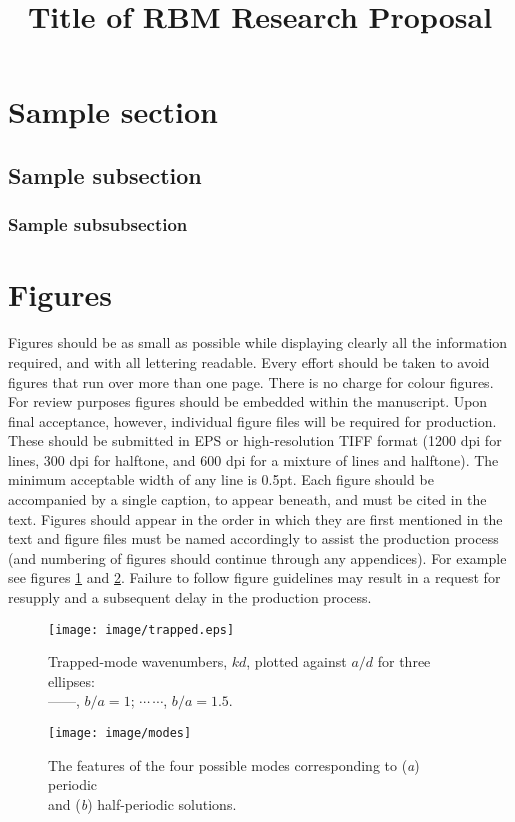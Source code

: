 \documentclass[12pt, a4paper]{article}
\title{Title of RBM Research Proposal}
\begin{document}


\section{Sample section}

\subsection{Sample subsection}

\subsubsection{Sample subsubsection}


\section{Figures}
Figures should be as small as possible while displaying clearly all the information required, and with all lettering readable. Every effort should be taken to avoid figures that run over more than one page. There is no charge for colour figures. For review purposes figures should be embedded within the manuscript. Upon final acceptance, however, individual figure files will be required for production. These should be submitted in EPS or high-resolution TIFF format (1200 dpi for lines, 300 dpi for halftone, and 600 dpi for a mixture of lines and halftone). The minimum acceptable width of any line is 0.5pt. Each figure should be accompanied by a single caption, to appear beneath, and must be cited in the text. Figures should appear in the order in which they are first mentioned in the text and figure files must be named accordingly to assist the production process (and numbering of figures should continue through any appendices). For example see figures \ref{fig:ka} and \ref{fig:kd}. Failure to follow figure guidelines may result in a request for resupply and a subsequent delay in the production process.

\begin{figure}[htbp]
  \centering
  \texttt{[image: image/trapped.eps]}%
  \caption{Trapped-mode wavenumbers, $kd$, plotted against $a/d$ for
    three ellipses:\protect\\%
    ---$\!$---,
    $b/a=1$; $\cdots$\,$\cdots$, $b/a=1.5$.}
\label{fig:ka}
\end{figure}

\begin{figure}
  \centering
  \texttt{[image: image/modes]}
  \caption{The features of the four possible modes corresponding to
  (\textit{a}) periodic\protect\\ and (\textit{b}) half-periodic solutions.}
\label{fig:kd}
\end{figure}
\end{document}
